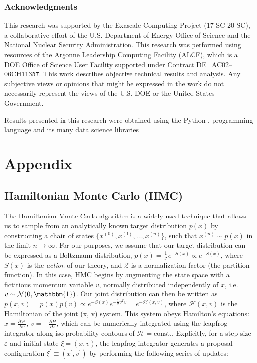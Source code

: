 \documentclass{article} %
\begin{document}
\subsubsection*{Acknowledgments}
This research was supported by the Exascale Computing Project (17-SC-20-SC), a collaborative effort of the U.S. Department of Energy Office of Science and the National Nuclear Security Administration.
This research was performed using resources of the Argonne Leadership Computing Facility (ALCF), which is a DOE Office of Science User
Facility supported under Contract DE\_AC02--06CH11357. 
%
This work describes objective technical results and analysis.
%
Any subjective views or opinions that might be expressed in the work do not necessarily represent the views of the U.S.
DOE or the United States Government.
%

Results presented in this research were obtained using the Python \citep{van1995python}, programming language and its many data science libraries \citep{matplotlib,numpyharris2020array,tensorflow2015-whitepaper,seaborn_michael_waskom_2017_883859,ipython4160251}




\appendix
\section{Appendix}
%
\subsection{\label{subsec:HMC}Hamiltonian Monte Carlo (HMC)}
%
The Hamiltonian Monte Carlo algorithm is a widely used technique that allows us to sample from an analytically known
target distribution \(p(x)\) by constructing a chain of states \(\{x^{(0)}, x^{(1)}, \ldots, x^{(n)}\}\), such that
\(x^{(n)}\sim p(x)\) in the limit \(n\rightarrow\infty\).
%
For our purposes, we assume that our target distribution can be expressed as a Boltzmann distribution, \(p(x) =
\tfrac{1}{\mathcal{Z}} e^{-S(x)}\propto e^{-S(x)}\), where \(S(x)\) is the \emph{action} of our theory, and
\(\mathcal{Z}\) is a normalization factor (the partition function).
%
In this case, HMC begins by augmenting the state space with a fictitious momentum variable \(v\), normally
distributed independently of \(x\), i.e.\ \(v\sim\mathcal{N}(0, \mathbbm{1})\).
%
Our joint distribution can then be written as \(%
   p(x, v) = p(x) p(v) \propto e^{-S(x)} e^{-\frac{1}{2}v^{T}v} = e^{-\mathcal{H}(x, v)}
\), where \(\mathcal{H}(x, v)\) is the Hamiltonian of the joint (x, v) system.
%
This system obeys Hamilton's equations: %
\(\dot{x} = \frac{\partial\mathcal{H}}{\partial v}\), \(\dot{v} = -\frac{\partial H}{\partial x}\), which can be 
numerically integrated using the leapfrog integrator along iso-probability contours of \(\mathcal{H} = \text{const.}\).
%
Explicitly, for a step size \(\varepsilon\) and initial state \(\xi = (x, v)\), the leapfrog integrator generates a
proposal configuration \(\xi^{\prime} \equiv (x^{\prime}, v^{\prime})\) by performing the following series of updates: 
%
\end{document}
